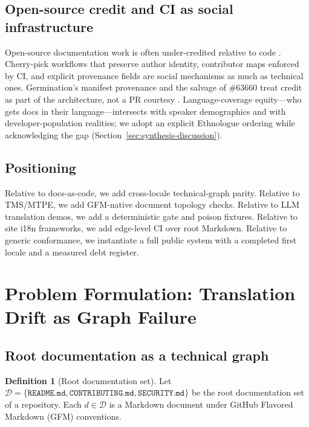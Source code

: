 \documentclass[11pt]{article}
\theoremstyle{definition}
\newtheorem{definition}{Definition}
\theoremstyle{plain}
\theoremstyle{remark}
\begin{document}
\subsection{Open-source credit and CI as social infrastructure}

Open-source documentation work is often under-credited relative to code
\citep{geiger2017}. Cherry-pick workflows that preserve author identity,
contributor maps enforced by CI, and explicit provenance fields are social
mechanisms as much as technical ones. Germination's manifest provenance and
the salvage of \#63660 treat credit as part of the architecture, not a PR
courtesy \citep{hermespr80391}. Language-coverage equity---who gets docs in
their language---intersects with speaker demographics \citep{ethnologue}
and with developer-population realities; we adopt an explicit Ethnologue
ordering while acknowledging the gap (Section~\ref{sec:synthesis-discussion}).

\subsection{Positioning}

Relative to docs-as-code, we add cross-locale technical-graph parity.
Relative to TMS/MTPE, we add GFM-native document topology checks.
Relative to LLM translation demos, we add a deterministic gate and poison
fixtures. Relative to site i18n frameworks, we add edge-level CI over root
Markdown. Relative to generic conformance, we instantiate a full public
system with a completed first locale and a measured debt register.


\section{Problem Formulation: Translation Drift as Graph Failure}
\label{sec:problem}

\subsection{Root documentation as a technical graph}

\begin{definition}[Root documentation set]
\label{def:root}
Let $\mathcal{D} = \{\texttt{README.md}, \texttt{CONTRIBUTING.md},
\texttt{SECURITY.md}\}$ be the root documentation set of a repository. Each
$d \in \mathcal{D}$ is a Markdown document under GitHub Flavored Markdown
(GFM) conventions.
\end{definition}
\end{document}
